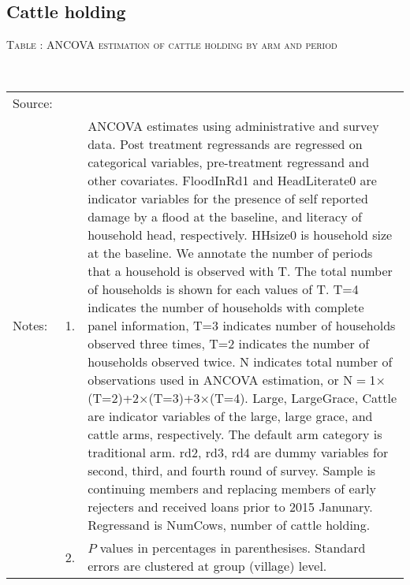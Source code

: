 

\subsection{Cattle holding}


\hspace{-1cm}\begin{minipage}[t]{14cm}
\hfil\textsc{\normalsize Table \thetable: ANCOVA estimation of cattle holding by arm and period\label{tab ANCOVA cow time varying}}\\
\setlength{\tabcolsep}{1pt}
\setlength{\baselineskip}{8pt}
\renewcommand{\arraystretch}{.55}
\hfil{}\\
\renewcommand{\arraystretch}{.8}
\setlength{\tabcolsep}{1pt}
\begin{tabular}{>{\hfill\scriptsize}p{1cm}<{}>{\hfill\scriptsize}p{.25cm}<{}>{\scriptsize}p{12cm}<{\hfill}}
Source:& \multicolumn{2}{l}{\scriptsize Estimated with GUK administrative and survey data.}\\
Notes: & 1. & ANCOVA estimates using administrative and survey data. Post treatment regressands are regressed on categorical variables, pre-treatment regressand and other covariates. \textsf{FloodInRd1} and \textsf{HeadLiterate0} are indicator variables for the presence of self reported damage by a flood at the baseline, and literacy of household head, respectively. \textsf{HHsize0} is household size at the baseline. We annotate the number of periods that a household is observed with \textsf{T}. The total number of households is shown for each values of \textsf{T}. \textsf{T=4} indicates the number of households with complete panel information, \textsf{T=3} indicates number of households observed three times, \textsf{T=2} indicates the number of households observed twice. \textsf{N} indicates total number of observations used in ANCOVA estimation, or \textsf{N$=$1$\times$(T=2)+2$\times$(T=3)+3$\times$(T=4)}.  \textsf{Large}, \textsf{LargeGrace}, \textsf{Cattle} are indicator variables of the \textsf{large}, \textsf{large grace}, and \textsf{cattle} arms, respectively. The default arm category is \textsf{traditional} arm. \textsf{rd2, rd3, rd4} are dummy variables for second, third, and fourth round of survey. Sample is continuing members and replacing members of early rejecters and received loans prior to 2015 Janunary. Regressand is \textsf{NumCows}, number of cattle holding. \\
& 2. & $P$ values in percentages in parenthesises. Standard errors are clustered at group (village) level.
\end{tabular}
\end{minipage}


